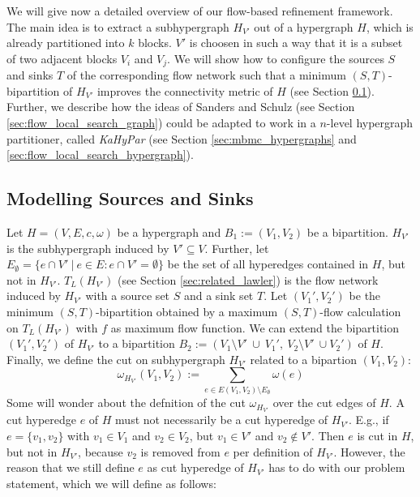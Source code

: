 We will give now a detailed overview of our flow-based refinement framework. The main
idea is to extract a subhypergraph $H_{V'}$ out of a hypergraph $H$, which is already
partitioned into $k$ blocks. $V'$ is choosen in such a way that it is a subset of two
adjacent blocks $V_i$ and $V_j$. We will show how to configure
the sources $S$ and sinks $T$ of the corresponding flow network such that
a minimum $(S,T)$-bipartition of $H_{V'}$ improves the connectivity metric of $H$
(see Section \ref{sec:source_and_sink}). Further, we describe how the ideas of
Sanders and Schulz \cite{sanders2011engineering} (see Section \ref{sec:flow_local_search_graph}) 
could be adapted to work in a $n$-level hypergraph partitioner, called \emph{KaHyPar}
(see Section \ref{sec:mbmc_hypergraphs} and \ref{sec:flow_local_search_hypergraph}). 

\subsection{Modelling Sources and Sinks}
\label{sec:source_and_sink}

Let $H = (V,E,c,\omega)$ be a hypergraph and $B_1 := (V_1, V_2)$ be a bipartition.
$H_{V'}$ is the subhypergraph induced by $V' \subseteq V$. 
Further, let $E_{\emptyset} = \{ e \cap V'\ |\ e \in E: e \cap V' = \emptyset\} $
be the set of all hyperedges contained in $H$, but not in $H_{V'}$. $T_L(H_{V'})$ 
(see Section \ref{sec:related_lawler}) is the flow network induced by $H_{V'}$ with a
source set $S$ and a sink set $T$. Let $(V_1',V_2')$ be the minimum $(S,T)$-bipartition
obtained by a maximum $(S,T)$-flow calculation on $T_L(H_{V'})$ with $f$ as maximum flow
function. We can extend the bipartition $(V_1',V_2')$ of $H_{V'}$ to a bipartition 
$B_2 := (V_1 \setminus V'\ \cup\ V_1',\ V_2 \setminus V'\ \cup V_2' )$ of $H$. Finally,
we define the cut on subhypergraph $H_{V'}$ related to a
bipartion $(V_1,V_2)$:
\[\omega_{H_{V'}}(V_1,V_2) := \sum_{e \in E(V_1,V_2) \setminus E_{\emptyset}} \omega(e) \]
Some will wonder about the defnition of the cut $\omega_{H_{V'}}$ over the
cut edges of $H$. A cut hyperedge $e$ of $H$ must not necessarily be a cut hyperedge
of $H_{V'}$. E.g., if $e = \{v_1,v_2\}$ with $v_1 \in V_1$ and $v_2 \in V_2$, but
$v_1 \in V'$ and $v_2 \notin V'$. Then $e$ is cut in $H$, but not in $H_{V'}$, because
$v_2$ is removed from $e$ per definition of $H_{V'}$. However, the reason that we still
define $e$ as cut hyperedge of $H_{V'}$ has to do with our problem statement, 
which we will define as follows:

